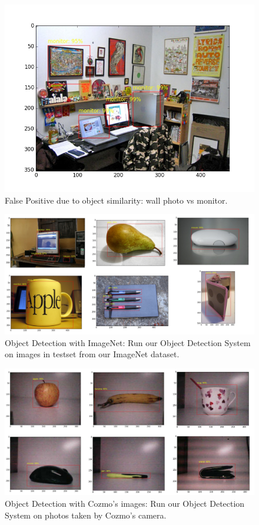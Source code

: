 \begin{figure}[tb]
	\centering
	\includegraphics[width=0.8\hsize]{./figures/similarObj}
	\caption{False Positive due to object similarity: wall photo vs monitor.}
	\label{fig:similarObj}
\end{figure}

\begin{figure}[tb]
	\centering
	\includegraphics[width=1.0\hsize]{./figures/objDetImgNet}
	\caption{Object Detection with ImageNet: Run our Object Detection System on images in testset from our ImageNet dataset.}
	\label{fig:objDetImgNet}
\end{figure}

\begin{figure}[tb]
	\centering
	\includegraphics[width=1.0\hsize]{./figures/objDetCozmo}
	\caption{Object Detection with Cozmo's images: Run our Object Detection System on photos taken by Cozmo's camera.}
	\label{fig:objDetCozmom}
\end{figure}

